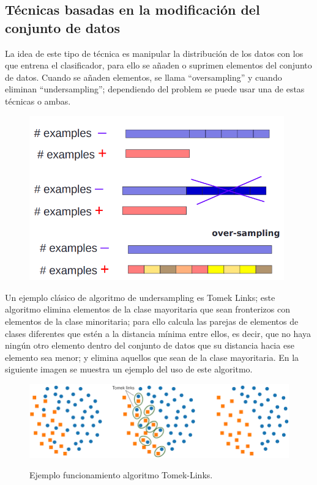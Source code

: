 \subsection{Técnicas basadas en la modificación del conjunto de datos}
La idea de este tipo de técnica es manipular la distribución de los datos con los que entrena el clasificador, para ello se añaden o suprimen elementos del conjunto de datos. Cuando se añaden elementos, se llama “oversampling” y cuando eliminan “undersampling”; dependiendo del problem se puede usar una de estas técnicas o ambas.\newline
\newpage
\begin{figure}[h]
	\centering
	\includegraphics[width=110mm]{imagenes/oversampling_undersampling.png}
	\label{fig:6}
\end{figure}
\verticalspace

Un ejemplo clásico de algoritmo de undersampling es Tomek Links; este algoritmo elimina elementos de la clase mayoritaria que sean fronterizos con elementos de la clase minoritaria; para ello calcula las parejas de elementos de clases diferentes que estén a la distancia mínima entre ellos, es decir, que no haya ningún otro elemento dentro del conjunto de datos que su distancia hacia ese elemento sea menor; y elimina aquellos que sean de la clase mayoritaria. En la siguiente imagen se muestra un ejemplo del uso de este algoritmo.\newline


\begin{figure}[h]
	\centering
	\includegraphics[width=120mm]{imagenes/tomek-example.png}
	\label{fig:7}
	\caption{Ejemplo funcionamiento algoritmo Tomek-Links.}
\end{figure}
\verticalspace

